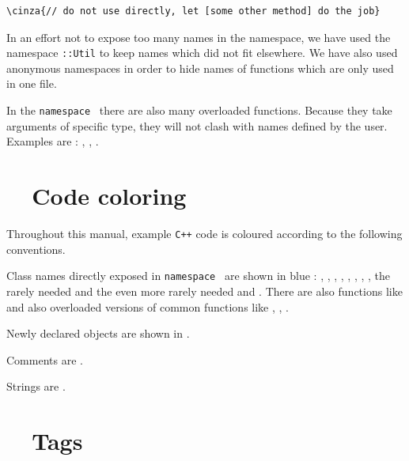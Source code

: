 \begin{Verbatim}[commandchars=\\\{\},formatcom=\small\tt,baselinestretch=0.94]
   \cinza{// do not use directly, let [some other method] do the job}
\end{Verbatim}

In an effort not to expose too many names in the {\small\tt{}} namespace, we have
used the namespace {\small\tt{}::Util} to keep names which did not fit elsewhere.
We have also used anonymous namespaces in order to hide names of functions which are
only used in one file.

In the {\small\tt namespace } there are also many overloaded functions.
Because they take arguments of specific type, they will not clash with names defined
by the user.
Examples are : {\small\tt{}}, {\small\tt{}}, {\small\tt{}}.


\section{~~Code coloring}\label{\numb section 11.\numb parag 2}

Throughout this manual, example {\tt C++} code is coloured according to the following
conventions.

Class names directly exposed in {\small\tt namespace } are shown in blue :
{\small\tt {}}, {\small\tt {}}, {\small\tt {}},
{\small\tt {}}, {\small\tt {}},
{\small\tt {}}, {\small\tt {}},
{\small\tt {}}, the rarely needed {\small\tt {}} and
the even more rarely needed {\small\tt {}} and {\small\tt{}}.
There are also functions like {\small\tt {}} and also overloaded versions
of common functions like {\small\tt{}}, {\small\tt {}}, {\small\tt {}}.

Newly declared objects are shown in .

Comments are .

Strings are .


\section{~~Tags}\label{\numb section 11.\numb parag 3}

